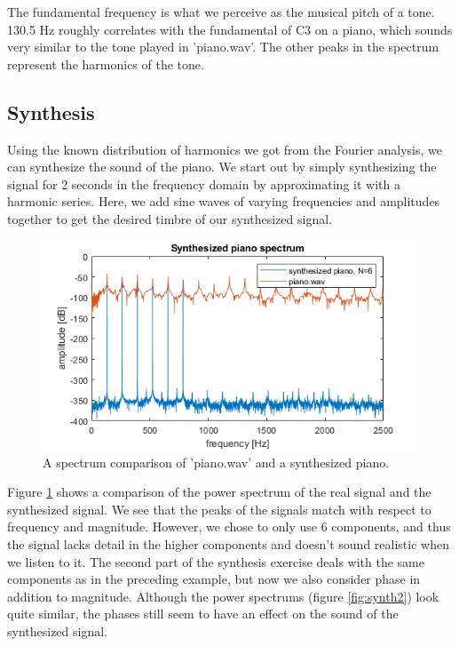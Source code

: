 \documentclass[journal]{IEEEtran}
\begin{document}
The fundamental frequency is what we perceive as the musical pitch of a tone. 130.5 Hz roughly correlates with the fundamental of C3 on a piano, which sounds very similar to the tone played in 'piano.wav'. The other peaks in the spectrum represent the harmonics of the tone. 

\subsection{Synthesis}
Using the known distribution of harmonics we got from the Fourier analysis, we can synthesize the sound of the piano. We start out by simply synthesizing the signal for 2 seconds in the frequency domain by approximating it with a harmonic series. Here, we add sine waves of varying frequencies and amplitudes together to get the desired timbre of our synthesized signal. 
\begin{figure} [h]
    \centering
    \includegraphics[width=\linewidth]{assignment_01/plots/synth.png}
    \caption{A spectrum comparison of 'piano.wav' and a synthesized piano.}
    \label{fig:synth}
\end{figure}
\newline
Figure \ref{fig:synth} shows a comparison of the power spectrum of the real signal and the synthesized signal. We see that the peaks of the signals match with respect to frequency and magnitude. However, we chose to only use 6 components, and thus the signal lacks detail in the higher components and doesn't sound realistic when we listen to it.
The second part of the synthesis exercise deals with the same components as in the preceding example, but now we also consider phase in addition to magnitude. Although the power spectrums (figure \ref{fig:synth2}) look quite similar, the phases still seem to have an effect on the sound of the synthesized signal.
\newline
\end{document}
